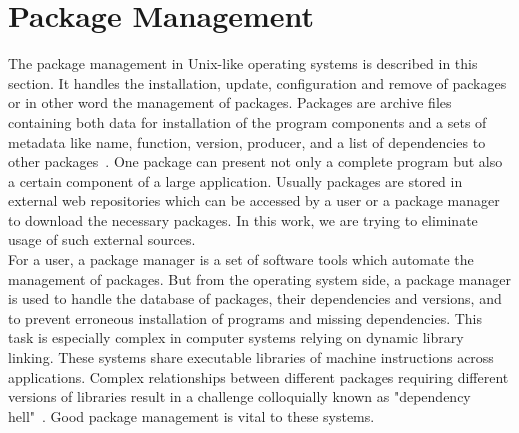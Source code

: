 \section{Package Management} \label{sec:pm}
The package management in Unix-like operating systems is described in this section.
It handles the installation, update, configuration and remove of packages or in other word the management of packages.
Packages are archive files containing both data for installation of the program components and a sets of metadata like name, function, version, producer, and a list of dependencies to other packages~\cite*{opium}. 
One package can present not only a complete program but also a certain component of a large application.
Usually packages are stored in external web repositories which can be accessed by a user or a package manager to download the necessary packages. %
In this work, we are trying to eliminate usage of such external sources.\\
For a user, a package manager is a set of software tools which automate the management of packages.
But from the operating system side, a package manager is used to handle the database of packages, their dependencies and versions, and to prevent erroneous installation of programs and missing dependencies.
This task is especially complex in computer systems relying on dynamic library linking. 
These systems share executable libraries of machine instructions across  applications. 
Complex relationships between different packages requiring different versions of libraries result in a challenge colloquially known as "dependency hell"~\cite*{linuxgeek}.
Good package management is vital to these systems.\\
